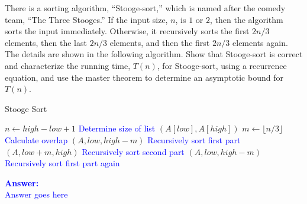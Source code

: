 \item{}
There is a sorting algorithm, ``Stooge-sort,'' which is named after the comedy
team, ``The Three Stooges.'' If the input size, $n$, is $1$ or $2$, then the
algorithm sorts the input immediately. Otherwise, it recursively sorts the first
$2n/3$ elements, then the last $2n/3$ elements, and then the first $2n/3$
elements again. The details are shown in the following algorithm. Show that
Stooge-sort is correct and characterize the running time, $T(n)$, for
Stooge-sort, using a recurrence equation, and use the master theorem to
determine an asymptotic bound for $T(n)$.\\[12pt]
\begin{algorithm}[H]
    \caption{Stooge Sort}
    \begin{algorithmic}[1]
            \State $n\gets high-low+1$
            \Comment\textcolor{blue}{Determine size of list}
            \Statex
                    $(A[low],A[high])$
                \EndIf
                \State $m\gets\lfloor n/3\rfloor$
                \Comment\textcolor{blue}{Calculate overlap}
                \Statex
                $(A,low,high-m)$
                \Comment\textcolor{blue}{Recursively sort first part}
                $(A,low+m,high)$
                \Comment\textcolor{blue}{Recursively sort second part}
                $(A,low,high-m)$
                \Comment\textcolor{blue}{Recursively sort first part again}
            \EndIf
        \EndProcedure
    \end{algorithmic}
\end{algorithm}
\ifanswers
\textcolor{blue}{
\textbf{Answer:}\\[6pt]
Answer goes here
}
\newpage
\fi
